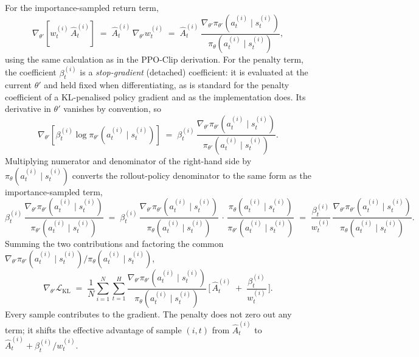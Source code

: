 \documentclass{article}
\begin{document}
For the importance-sampled return term,
\[
\nabla_{\theta'}\!\left[w_t^{(i)}\,\hat{A}_t^{(i)}\right]
\;=\;
\hat{A}_t^{(i)}\,\nabla_{\theta'} w_t^{(i)}
\;=\;
\hat{A}_t^{(i)}\,
\frac{\nabla_{\theta'} \pi_{\theta'}\!\left(a_t^{(i)} \mid s_t^{(i)}\right)}
     {\pi_\theta\!\left(a_t^{(i)} \mid s_t^{(i)}\right)},
\]
using the same calculation as in the PPO-Clip derivation. For the
penalty term, the coefficient $\beta_t^{(i)}$ is a \emph{stop-gradient}
(detached) coefficient: it is evaluated at the current $\theta'$ and
held fixed when differentiating, as is standard for the penalty
coefficient of a KL-penalised policy gradient and as the
implementation does. Its derivative in $\theta'$ vanishes by
convention, so
\[
\nabla_{\theta'}\!\left[\beta_t^{(i)}\log\pi_{\theta'}\!\left(a_t^{(i)} \mid s_t^{(i)}\right)\right]
\;=\;
\beta_t^{(i)}\,
\frac{\nabla_{\theta'} \pi_{\theta'}\!\left(a_t^{(i)} \mid s_t^{(i)}\right)}
     {\pi_{\theta'}\!\left(a_t^{(i)} \mid s_t^{(i)}\right)}.
\]
Multiplying numerator and denominator of the right-hand side by
$\pi_\theta(a_t^{(i)} \mid s_t^{(i)})$ converts the rollout-policy
denominator to the same form as the importance-sampled term,
\[
\beta_t^{(i)}\,
\frac{\nabla_{\theta'} \pi_{\theta'}\!\left(a_t^{(i)} \mid s_t^{(i)}\right)}
     {\pi_{\theta'}\!\left(a_t^{(i)} \mid s_t^{(i)}\right)}
\;=\;
\beta_t^{(i)}\,
\frac{\nabla_{\theta'} \pi_{\theta'}\!\left(a_t^{(i)} \mid s_t^{(i)}\right)}
     {\pi_\theta\!\left(a_t^{(i)} \mid s_t^{(i)}\right)}\,
\cdot\,
\frac{\pi_\theta\!\left(a_t^{(i)} \mid s_t^{(i)}\right)}
     {\pi_{\theta'}\!\left(a_t^{(i)} \mid s_t^{(i)}\right)}
\;=\;
\frac{\beta_t^{(i)}}{w_t^{(i)}}\,
\frac{\nabla_{\theta'} \pi_{\theta'}\!\left(a_t^{(i)} \mid s_t^{(i)}\right)}
     {\pi_\theta\!\left(a_t^{(i)} \mid s_t^{(i)}\right)}.
\]
Summing the two contributions and factoring the common
$\nabla_{\theta'} \pi_{\theta'}\!\left(a_t^{(i)} \mid s_t^{(i)}\right)
/ \pi_\theta\!\left(a_t^{(i)} \mid s_t^{(i)}\right)$,
\begin{equation}
\nabla_{\theta'}\mathcal{L}_{\mathrm{KL}}
\;=\;
\frac{1}{N}\sum_{i=1}^{N}\sum_{t=1}^{H}
\frac{\nabla_{\theta'} \pi_{\theta'}\!\left(a_t^{(i)} \mid s_t^{(i)}\right)}
     {\pi_\theta\!\left(a_t^{(i)} \mid s_t^{(i)}\right)}\,
\Biggl[\,\hat{A}_t^{(i)} \;+\; \frac{\beta_t^{(i)}}{w_t^{(i)}}\,\Biggr].
\label{eq:kl-grad}
\end{equation}
Every sample contributes to the gradient. The penalty does not zero
out any term; it shifts the effective advantage of sample $(i,t)$
from $\hat{A}_t^{(i)}$ to
$\hat{A}_t^{(i)} + \beta_t^{(i)}/w_t^{(i)}$.
\end{document}
